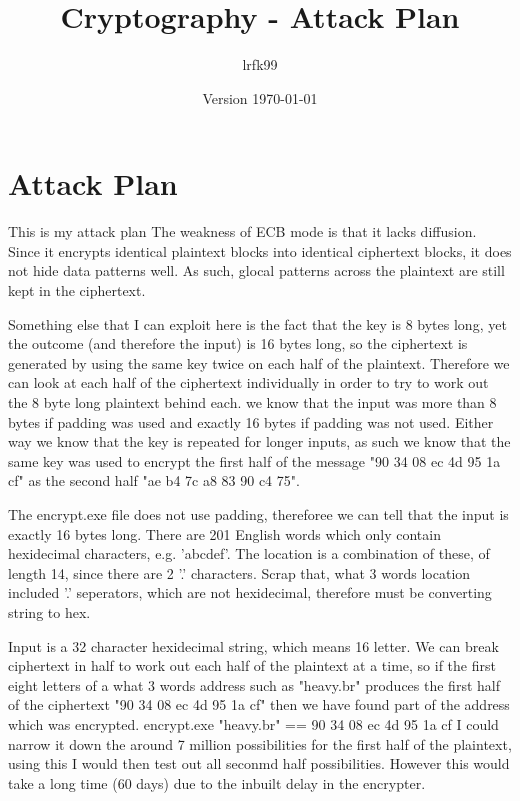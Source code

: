 \documentclass[a4paper, 11pt]{article}
\title{Cryptography - Attack Plan}
\date{Version \today}
\author{lrfk99}
\begin{document}
\maketitle

\section{Attack Plan}

This is my attack plan
The weakness of ECB mode is that it lacks diffusion. Since it encrypts identical plaintext blocks into 
identical ciphertext blocks, it does not hide data patterns well. 
As such, glocal patterns across the plaintext are still kept in the ciphertext.

Something else that I can exploit here is the fact that the key is 8 bytes long, 
yet the outcome (and therefore the input) is 16 bytes long, 
so the ciphertext is generated by using the same key twice on each half of the plaintext.
Therefore we can look at each half of the ciphertext individually in order to try to work out the 8 byte long plaintext behind each.
we know that the input was more than 8 bytes if padding was used 
and exactly 16 bytes if padding was not used.
Either way we know that the key is repeated for longer inputs, as such we know that the same key was used to 
encrypt the first half of the message "90 34 08 ec 4d 95 1a cf" as the second half "ae b4 7c a8 83 90 c4 75".

The encrypt.exe file does not use padding, thereforee we can tell that the input is exactly 16 bytes long.
There are 201 English words which only contain hexidecimal characters, e.g. 'abcdef'. The location is a combination of these, 
of length 14, since there are 2 '.' characters.
Scrap that, what 3 words location included '.' seperators, which are not hexidecimal, therefore must be converting string to hex.


Input is a 32 character hexidecimal string, which means 16 letter.
We can break ciphertext in half to work out each half of the plaintext at a time, so if the first eight letters of a what 3 words 
address such as "heavy.br" produces the first half of the ciphertext "90 34 08 ec 4d 95 1a cf" then we have found part of the 
address which was encrypted.
encrypt.exe "heavy.br" == 90 34 08 ec 4d 95 1a cf 
I could narrow it down the around 7 million possibilities for the first half of the plaintext, using this I would then 
test out all seconmd half possibilities. However this would take a long time (60 days) due to the inbuilt delay in the encrypter.
\end{document}
